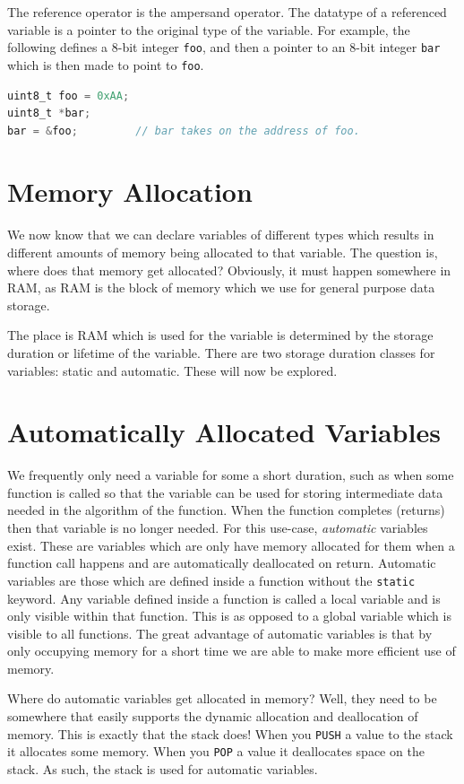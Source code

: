 The reference operator is the ampersand operator. The datatype of a referenced variable is a pointer to the original type of the variable.
For example, the following defines a 8-bit integer \texttt{foo}, and then a pointer to an 8-bit integer \texttt{bar} which is then made to point to \texttt{foo}.

\begin{lstlisting}[language=C]
uint8_t foo = 0xAA;
uint8_t *bar;
bar = &foo;         // bar takes on the address of foo.
\end{lstlisting}

\section{Memory Allocation}
We now know that we can declare variables of different types which results in different amounts of memory being allocated to that variable. 
The question is, where does that memory get allocated?
Obviously, it must happen somewhere in RAM, as RAM is the block of memory which we use for general purpose data storage. 

The place is RAM which is used for the variable is determined by the storage duration or lifetime of the variable. 
There are two storage duration classes for variables: static and automatic. These will now be explored. 

\section{Automatically Allocated Variables}
We frequently only need a variable for some a short duration, such as when some function is called so that the variable can be used for storing intermediate data needed in the algorithm of the function.
When the function completes (returns) then that variable is no longer needed.
For this use-case, \emph{automatic} variables exist. 
These are variables which are only have memory allocated for them when a function call happens and are automatically deallocated on return. 
Automatic variables are those which are defined inside a function without the \texttt{static} keyword. Any variable defined inside a function is called a local variable and is only visible within that function. This is as opposed to a global variable which is visible to all functions. 
The great advantage of automatic variables is that by only occupying memory for a short time we are able to make more efficient use of memory. 

Where do automatic variables get allocated in memory? Well, they need to be somewhere that easily supports the dynamic allocation and deallocation of memory. This is exactly that the stack does! When you \texttt{PUSH} a value to the stack it allocates some memory. When you \texttt{POP} a value it deallocates space on the stack. As such, the stack is used for automatic variables.

